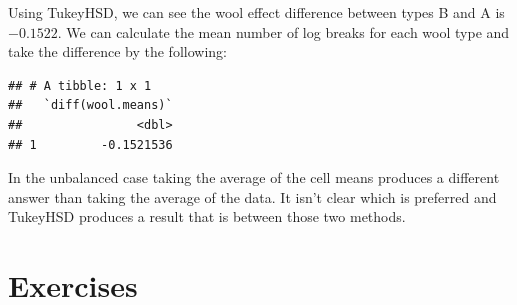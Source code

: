 \documentclass[]{book}
\newenvironment{Shaded}{\begin{snugshade}}{\end{snugshade}}
\newcommand{\KeywordTok}[1]{\textcolor[rgb]{0.13,0.29,0.53}{\textbf{{#1}}}}
\newcommand{\DataTypeTok}[1]{\textcolor[rgb]{0.13,0.29,0.53}{{#1}}}
\newcommand{\StringTok}[1]{\textcolor[rgb]{0.31,0.60,0.02}{{#1}}}
\newcommand{\NormalTok}[1]{{#1}}
\theoremstyle{definition}
\theoremstyle{definition}
\theoremstyle{remark}
\begin{document}
Using TukeyHSD, we can see the wool effect difference between types B
and A is \(-0.1522\). We can calculate the mean number of log breaks for
each wool type and take the difference by the following:

\begin{Shaded}
\end{Shaded}

\begin{verbatim}
## # A tibble: 1 x 1
##   `diff(wool.means)`
##                <dbl>
## 1         -0.1521536
\end{verbatim}

In the unbalanced case taking the average of the cell means produces a
different answer than taking the average of the data. It isn't clear
which is preferred and TukeyHSD produces a result that is between those
two methods.

\section{Exercises}\label{exercises-8}
\end{document}
